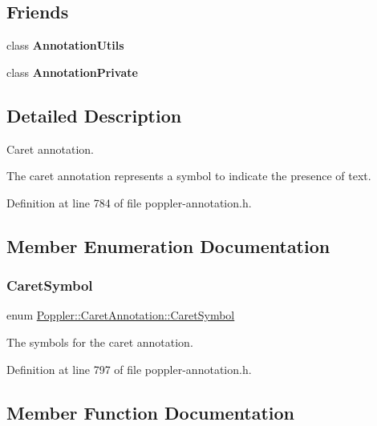 \subsection*{Friends}
\begin{DoxyCompactItemize}
\item 
\mbox{\label{class_poppler_1_1_caret_annotation_a13daac1cbc1823e18498579fc26b344f}} 
class {\bfseries Annotation\+Utils}
\item 
\mbox{\label{class_poppler_1_1_caret_annotation_add0bc3e32e560f9e9eb3025587c1ad54}} 
class {\bfseries Annotation\+Private}
\end{DoxyCompactItemize}


\subsection{Detailed Description}
Caret annotation. 

The caret annotation represents a symbol to indicate the presence of text. 

Definition at line 784 of file poppler-\/annotation.\+h.



\subsection{Member Enumeration Documentation}
\mbox{\label{class_poppler_1_1_caret_annotation_a391714f3129aad14eb4c2e4094f6410a}} 
\subsubsection{\texorpdfstring{Caret\+Symbol}{CaretSymbol}}
{\footnotesize\ttfamily enum \hyperlink{class_poppler_1_1_caret_annotation_a391714f3129aad14eb4c2e4094f6410a}{Poppler\+::\+Caret\+Annotation\+::\+Caret\+Symbol}}

The symbols for the caret annotation. 

Definition at line 797 of file poppler-\/annotation.\+h.



\subsection{Member Function Documentation}
\mbox{\label{class_poppler_1_1_caret_annotation_a08a713ef697a4e318d20a1271d912b89}} 
